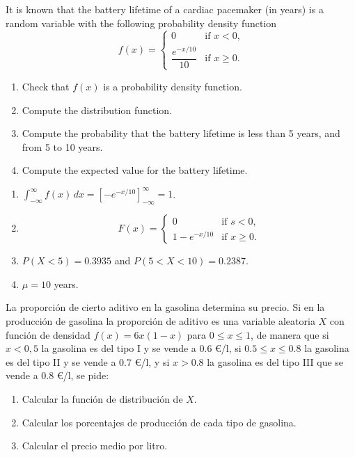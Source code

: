 {It is known that the battery lifetime of a cardiac pacemaker (in years) is a random variable with the following probability density function
\[
f(x)=
\begin{cases}
0 & \mbox{if $x<0$,}\\
\dfrac{e^{-x/10}}{10} & \mbox{if $x\geq 0$.}
\end{cases}
\]
\begin{enumerate}
\item Check that $f(x)$ is a probability density function.
\item Compute the distribution function.
\item Compute the probability that the battery lifetime is less than 5 years, and from 5 to 10 years.
\item Compute the expected value for the battery lifetime.
\end{enumerate}
}
{
\begin{enumerate}
\item $\int_{-\infty}^\infty f(x)\, dx = [-e^{-x/10}]_{-\infty}^\infty = 1$.
\item \[
F(x)=
\begin{cases}
0 & \mbox{if $s<0$,}\\
1-e^{-x/10} & \mbox{if $x\geq 0$.}
\end{cases}
\]
\item $P(X<5)=0.3935$ and $P(5<X<10)=0.2387$.
\item $\mu=10$ years.
\end{enumerate}
}
{}


{La proporción de cierto aditivo en la gasolina determina su precio. Si en la producción de gasolina la proporción de
aditivo es una variable aleatoria $X$ con función de densidad $f(x)=6x(1-x)$ para $0\leq x\leq 1$, de manera que si
$x<0,5$ la gasolina es del tipo I y se vende a $0.6$ \euro/l, si $0.5\leq x\leq 0.8$ la gasolina es del tipo II y se
vende a $0.7$ \euro/l, y si $x>0.8$ la gasolina es del tipo III que se vende a $0.8$ \euro/l, se pide:
\begin{enumerate}
\item Calcular la función de distribución de $X$.
\item Calcular los porcentajes de producción de cada tipo de gasolina.
\item Calcular el precio medio por litro.
\end{enumerate}
}
{}
{}


